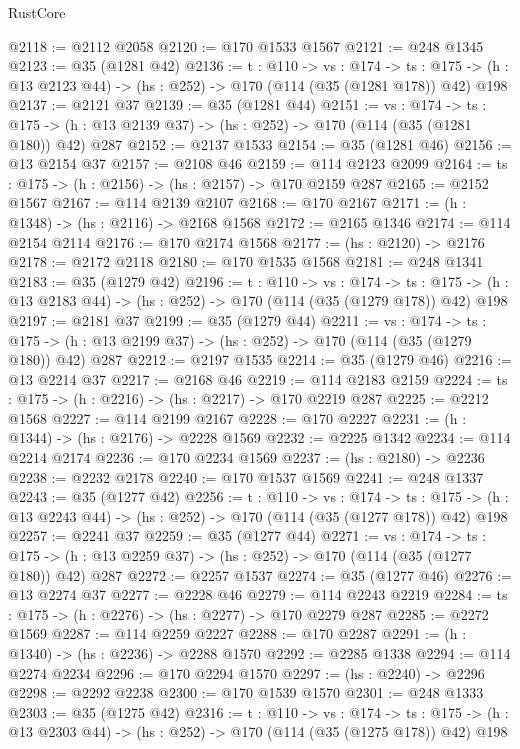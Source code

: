 \begin{lexlean}{RustCore}
\begin{coremodule}
@2118 := @2112 @2058
@2120 := @170 @1533 @1567
@2121 := @248 @1345
@2123 := @35 (@1281 @42)
@2136 := {t : @110} ->
  {vs : @174} ->
  {ts : @175} -> (h : @13 @2123 @44) -> (hs : @252) -> @170 (@114 (@35 (@1281 @178)) @42) @198
@2137 := @2121 @37
@2139 := @35 (@1281 @44)
@2151 := {vs : @174} ->
  {ts : @175} -> (h : @13 @2139 @37) -> (hs : @252) -> @170 (@114 (@35 (@1281 @180)) @42) @287
@2152 := @2137 @1533
@2154 := @35 (@1281 @46)
@2156 := @13 @2154 @37
@2157 := @2108 @46
@2159 := @114 @2123 @2099
@2164 := {ts : @175} -> (h : @2156) -> (hs : @2157) -> @170 @2159 @287
@2165 := @2152 @1567
@2167 := @114 @2139 @2107
@2168 := @170 @2167
@2171 := (h : @1348) -> (hs : @2116) -> @2168 @1568
@2172 := @2165 @1346
@2174 := @114 @2154 @2114
@2176 := @170 @2174 @1568
@2177 := (hs : @2120) -> @2176
@2178 := @2172 @2118
@2180 := @170 @1535 @1568
@2181 := @248 @1341
@2183 := @35 (@1279 @42)
@2196 := {t : @110} ->
  {vs : @174} ->
  {ts : @175} -> (h : @13 @2183 @44) -> (hs : @252) -> @170 (@114 (@35 (@1279 @178)) @42) @198
@2197 := @2181 @37
@2199 := @35 (@1279 @44)
@2211 := {vs : @174} ->
  {ts : @175} -> (h : @13 @2199 @37) -> (hs : @252) -> @170 (@114 (@35 (@1279 @180)) @42) @287
@2212 := @2197 @1535
@2214 := @35 (@1279 @46)
@2216 := @13 @2214 @37
@2217 := @2168 @46
@2219 := @114 @2183 @2159
@2224 := {ts : @175} -> (h : @2216) -> (hs : @2217) -> @170 @2219 @287
@2225 := @2212 @1568
@2227 := @114 @2199 @2167
@2228 := @170 @2227
@2231 := (h : @1344) -> (hs : @2176) -> @2228 @1569
@2232 := @2225 @1342
@2234 := @114 @2214 @2174
@2236 := @170 @2234 @1569
@2237 := (hs : @2180) -> @2236
@2238 := @2232 @2178
@2240 := @170 @1537 @1569
@2241 := @248 @1337
@2243 := @35 (@1277 @42)
@2256 := {t : @110} ->
  {vs : @174} ->
  {ts : @175} -> (h : @13 @2243 @44) -> (hs : @252) -> @170 (@114 (@35 (@1277 @178)) @42) @198
@2257 := @2241 @37
@2259 := @35 (@1277 @44)
@2271 := {vs : @174} ->
  {ts : @175} -> (h : @13 @2259 @37) -> (hs : @252) -> @170 (@114 (@35 (@1277 @180)) @42) @287
@2272 := @2257 @1537
@2274 := @35 (@1277 @46)
@2276 := @13 @2274 @37
@2277 := @2228 @46
@2279 := @114 @2243 @2219
@2284 := {ts : @175} -> (h : @2276) -> (hs : @2277) -> @170 @2279 @287
@2285 := @2272 @1569
@2287 := @114 @2259 @2227
@2288 := @170 @2287
@2291 := (h : @1340) -> (hs : @2236) -> @2288 @1570
@2292 := @2285 @1338
@2294 := @114 @2274 @2234
@2296 := @170 @2294 @1570
@2297 := (hs : @2240) -> @2296
@2298 := @2292 @2238
@2300 := @170 @1539 @1570
@2301 := @248 @1333
@2303 := @35 (@1275 @42)
@2316 := {t : @110} ->
  {vs : @174} ->
  {ts : @175} -> (h : @13 @2303 @44) -> (hs : @252) -> @170 (@114 (@35 (@1275 @178)) @42) @198

\end{coremodule}
\end{lexlean}
